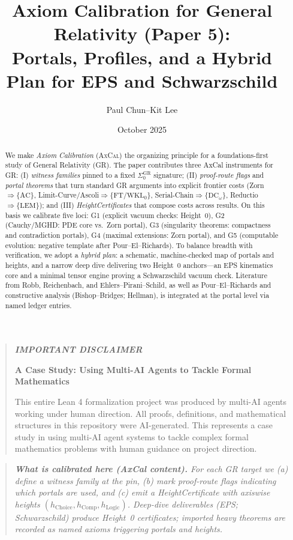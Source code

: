 \documentclass[11pt]{article}
\title{Axiom Calibration for General Relativity (Paper 5):\\
Portals, Profiles, and a Hybrid Plan for EPS and Schwarzschild}
\author{Paul Chun--Kit Lee}
\date{October 2025}
\newenvironment{mdframed}[1][]{\begin{quote}\itshape}{\end{quote}}
\theoremstyle{definition}
\theoremstyle{remark}
\newcommand{\LEM}{\mathrm{LEM}}
\newcommand{\FT}{\mathrm{FT}}
\newcommand{\WKLz}{\mathrm{WKL}_0}
\newcommand{\AC}{\mathrm{AC}}
\newcommand{\DCw}{\mathrm{DC}_\omega}
\newcommand{\SigmaZero}{\Sigma_{0}}
\newcommand{\AxCal}{\textsc{AxCal}}
\newcommand{\hChoice}{h_{\mathrm{Choice}}}    %
\newcommand{\hComp}{h_{\mathrm{Comp}}}        %
\newcommand{\hLogic}{h_{\mathrm{Logic}}}      %
\begin{document}
\maketitle

\begin{abstract}
We make \emph{Axiom Calibration} (\AxCal) the organizing principle for a foundations-first study of General Relativity (GR). The paper contributes three AxCal instruments for GR: (I) \emph{witness families} pinned to a fixed $\SigmaZero^{\mathrm{GR}}$ signature; (II) \emph{proof-route flags} and \emph{portal theorems} that turn standard GR arguments into explicit frontier costs (Zorn$\Rightarrow\{\AC\}$, Limit-Curve/Ascoli$\Rightarrow\{\FT/\WKLz\}$, Serial-Chain$\Rightarrow\{\DCw\}$, Reductio$\Rightarrow\{\LEM\}$); and (III) \emph{HeightCertificates} that compose costs across results. On this basis we calibrate five loci: G1 (explicit vacuum checks: Height~0), G2 (Cauchy/MGHD: PDE core vs.\ Zorn portal), G3 (singularity theorems: compactness and contradiction portals), G4 (maximal extensions: Zorn portal), and G5 (computable evolution: negative template after Pour--El--Richards). To balance breadth with verification, we adopt a \emph{hybrid plan}: a schematic, machine-checked map of portals and heights, and a narrow deep dive delivering two Height~0 anchors---an EPS kinematics core and a minimal tensor engine proving a Schwarzschild vacuum check. Literature from Robb, Reichenbach, and Ehlers--Pirani--Schild, as well as Pour--El--Richards and constructive analysis (Bishop--Bridges; Hellman), is integrated at the portal level via named ledger entries.
\end{abstract}

\begin{mdframed}[backgroundcolor=gray!10, linewidth=0pt]
\textbf{IMPORTANT DISCLAIMER}

\textbf{A Case Study: Using Multi-AI Agents to Tackle Formal Mathematics}

This entire Lean 4 formalization project was produced by multi-AI agents working under human direction. All proofs, definitions, and mathematical structures in this repository were AI-generated. This represents a case study in using multi-AI agent systems to tackle complex formal mathematics problems with human guidance on project direction.
\end{mdframed}

\begin{mdframed}[style=status]
\textbf{What is calibrated here (AxCal content).}
For each GR target we (a) define a \emph{witness family} at the pin, (b) mark \emph{proof-route flags} indicating which portals are used, and (c) emit a \emph{HeightCertificate} with axiswise heights $(\hChoice,\hComp,\hLogic)$. Deep-dive deliverables (EPS; Schwarzschild) produce Height~0 certificates; imported heavy theorems are recorded as \emph{named axioms} triggering portals and heights.
\end{mdframed}
\end{document}
